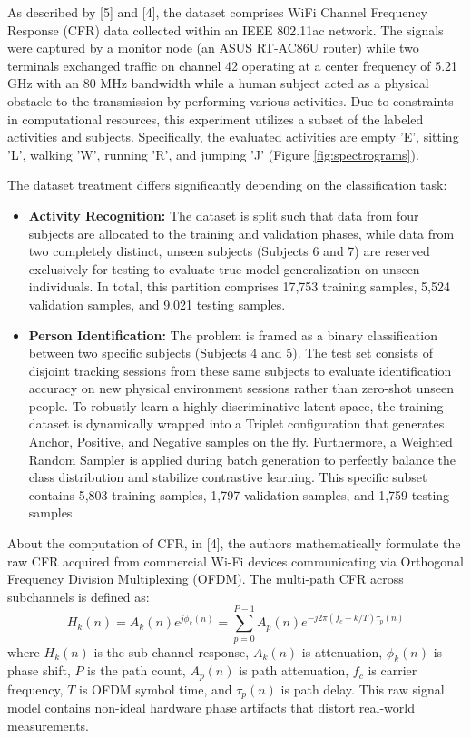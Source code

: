As described by [5] and [4], the dataset comprises WiFi Channel Frequency Response (CFR) data collected within an IEEE 802.11ac network. The signals were captured by a monitor node (an ASUS RT-AC86U router) while two terminals exchanged traffic on channel 42 operating at a center frequency of 5.21 GHz with an 80 MHz bandwidth while a human subject acted as a physical obstacle to the transmission by performing various activities. Due to constraints in computational resources, this experiment utilizes a subset of the labeled activities and subjects. Specifically, the evaluated activities are empty 'E', sitting 'L', walking 'W', running 'R', and jumping 'J' (Figure \ref{fig:spectrograms}).

The dataset treatment differs significantly depending on the classification task:
\begin{itemize}
    \item \textbf{Activity Recognition:} The dataset is split such that data from four subjects are allocated to the training and validation phases, while data from two completely distinct, unseen subjects (Subjects 6 and 7) are reserved exclusively for testing to evaluate true model generalization on unseen individuals. In total, this partition comprises 17,753 training samples, 5,524 validation samples, and 9,021 testing samples.
    \item \textbf{Person Identification:} The problem is framed as a binary classification between two specific subjects (Subjects 4 and 5). The test set consists of disjoint tracking sessions from these same subjects to evaluate identification accuracy on new physical environment sessions rather than zero-shot unseen people. To robustly learn a highly discriminative latent space, the training dataset is dynamically wrapped into a Triplet configuration that generates Anchor, Positive, and Negative samples on the fly. Furthermore, a Weighted Random Sampler is applied during batch generation to perfectly balance the class distribution and stabilize contrastive learning. This specific subset contains 5,803 training samples, 1,797 validation samples, and 1,759 testing samples.
\end{itemize}

About the computation of CFR, in [4], the authors mathematically formulate the raw CFR acquired from commercial Wi-Fi devices communicating via Orthogonal Frequency Division Multiplexing (OFDM). The multi-path CFR across subchannels is defined as:
\begin{equation}
H_k(n) = A_k(n)e^{j\phi_k(n)} = \sum_{p=0}^{P-1} A_p(n)e^{-j2\pi(f_c+k/T)\tau_p(n)}
\end{equation}
where $H_k(n)$ is the sub-channel response, $A_k(n)$ is attenuation, $\phi_k(n)$ is phase shift, $P$ is the path count, $A_p(n)$ is path attenuation, $f_c$ is carrier frequency, $T$ is OFDM symbol time, and $\tau_p(n)$ is path delay. This raw signal model contains non-ideal hardware phase artifacts that distort real-world measurements.

